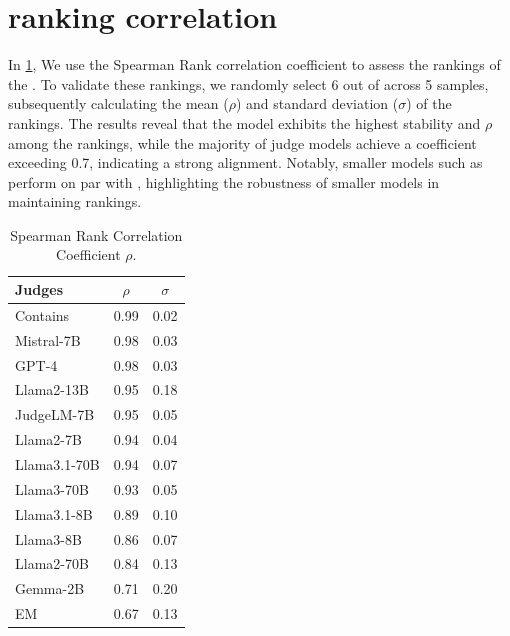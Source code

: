 \section{\Evaluatormodel ranking correlation }
\label{app:correlationcoefftable}


In \cref{tab:judges_rho_reversed}, We use the Spearman Rank correlation coefficient  \citep{spearman1904spearman} to assess the rankings of the \evaluatormodels. To validate these rankings, we randomly select 6 out of \nexamtakers \evaluatormodels across 5 samples, subsequently calculating the mean ($\rho$) and standard deviation ($\sigma$) of the rankings. The results reveal that the  model exhibits the highest stability and $\rho$ among the rankings, while the majority of judge models achieve a coefficient exceeding 0.7, indicating a strong alignment. Notably, smaller models such as  perform on par with \judge{\gpt}, highlighting the robustness of smaller models in maintaining rankings.

\begin{table}[H]
\label{tab:judges_rho_reversed}
    \centering
    \begin{tabular}{lcc}
        \toprule
        Judges & $\rho$ & $\sigma$ \\
        \midrule
        Contains & 0.99 & 0.02 \\
        Mistral-7B & 0.98 & 0.03 \\
        GPT-4 & 0.98 & 0.03 \\
        Llama2-13B & 0.95 & 0.18 \\
        JudgeLM-7B & 0.95 & 0.05 \\
        Llama2-7B & 0.94 & 0.04 \\
        Llama3.1-70B & 0.94 & 0.07 \\
        Llama3-70B & 0.93 & 0.05 \\
        Llama3.1-8B & 0.89 & 0.10 \\
        Llama3-8B & 0.86 & 0.07 \\
        Llama2-70B & 0.84 & 0.13 \\
        Gemma-2B & 0.71 & 0.20 \\
        EM & 0.67 & 0.13 \\
        \bottomrule
    \end{tabular}
            \captionsetup{skip=5pt}
    \caption{Spearman Rank Correlation Coefficient $\rho$.}
\end{table}

